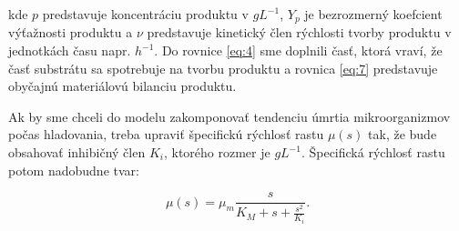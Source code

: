 \noindent kde $p$ predstavuje koncentráciu produktu v $gL^{-1}$, $Y_{p}$ je bezrozmerný koefcient výťažnosti produktu a $\nu$ predstavuje kinetický člen rýchlosti tvorby produktu v jednotkách času napr. $ h^{-1} $. Do rovnice \ref{eq:4} sme doplnili časť, ktorá vraví, že časť substrátu sa spotrebuje na tvorbu produktu a rovnica \ref{eq:7} predstavuje obyčajnú materiálovú bilanciu produktu.

Ak by sme chceli do modelu zakomponovať tendenciu úmrtia mikroorganizmov počas hladovania, treba upraviť špecifickú rýchlosť rastu $\mu(s)$ tak, že bude obsahovať inhibičný člen $ K_i $, ktorého rozmer je $gL^{-1}$. Špecifická rýchlosť rastu potom nadobudne tvar:

\begin{equation} \label{eq:8}
	\mu(s) = \mu_{m}\frac{s}{K_{M} + s + \frac{s^2}{K_i}}.
\end{equation}
